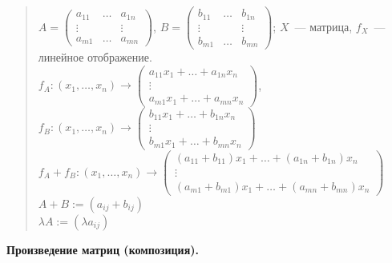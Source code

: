 \documentclass[12pt]{article}
\begin{document}
	\begin{quote}
		$A = \left(
		\begin{smallmatrix}
			a_{11} & \dots & a_{1n} \\
			\vdots &  & \vdots \\
			a_{m1} & \dots & a_{mn}
		\end{smallmatrix}
		\right)$, $B = \left(
		\begin{smallmatrix}
			b_{11} & \dots & b_{1n} \\
			\vdots &  & \vdots \\
			b_{m1} & \dots & b_{mn}
		\end{smallmatrix}
		\right)$; $X$~--- матрица, $f_X$~--- линейное отображение. \\
		$f_A: (x_1, \dots, x_n) \rightarrow
		\left( \begin{smallmatrix}
			a_{11}x_1 + \dots + a_{1n}x_n \\
			\vdots \\
			a_{m1}x_1 + \dots + a_{mn}x_n
		\end{smallmatrix} \right)
		$, $f_B: (x_1, \dots, x_n) \rightarrow \left(
		\begin{smallmatrix}
			b_{11}x_1 + \dots + b_{1n}x_n \\
			\vdots \\
			b_{m1}x_1 + \dots + b_{mn}x_n
		\end{smallmatrix}
		\right)$ \\
		$f_A + f_B: (x_1, \dots, x_n) \rightarrow \left(
		\begin{smallmatrix}
			(a_{11} + b_{11})x_1 + \dots + (a_{1n} + b_{1n})x_n \\
			\vdots \\
			(a_{m1} + b_{m1})x_1 + \dots + (a_{mn} + b_{mn})x_n
		\end{smallmatrix}
		\right)$ \\
		$A + B := (a_{ij} + b_{ij})$ \\
		$\lambda A := (\lambda a_{ij})$
	\end{quote}
	\textbf{Произведение матриц (композиция).}
\end{document}
